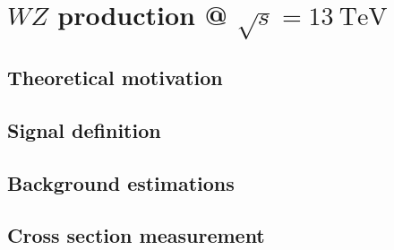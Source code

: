 \chapter[$WZ$ production @ $\sqrt{s} = 13~\mathrm{TeV}$][$WZ$ production @ $\sqrt{s} = 13~\mathrm{TeV}$]{$WZ$ production @ $\sqrt{s} = 13~\mathrm{TeV}$}
\label{ch:wz13tev}

\section{Theoretical motivation}\label{wz:theory}


\section{Signal definition}\label{wz:signal}


\section{Background estimations}\label{wz:background}


\section{Cross section measurement}\label{wz:xsec}

